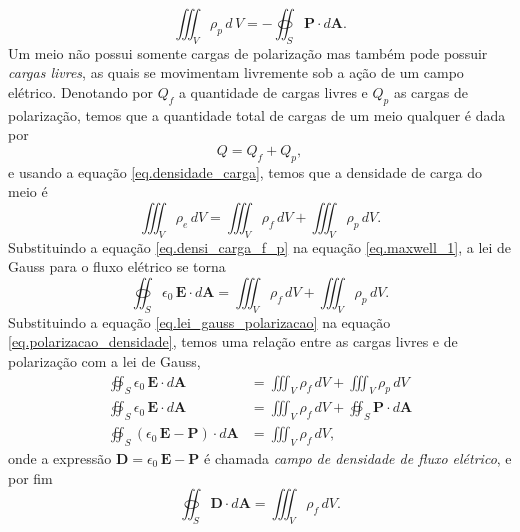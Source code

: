 \begin{equation}\label{eq.polarizacao_densidade}
\iiint_V\rho_p\,d\,V=-\oiint_S\mathbf{P}\cdot d\mathbf{A}.
\end{equation}
Um meio não possui somente cargas de polarização mas também pode possuir \textit{cargas livres}, as quais se movimentam livremente sob a ação de um campo elétrico. Denotando por $Q_f$ a quantidade de cargas livres e $Q_p$ as cargas de polarização, temos que a quantidade total de cargas de um meio qualquer é dada por
\begin{equation*}
Q=Q_f+Q_p,
\end{equation*} 
e usando a equação \ref{eq.densidade_carga}, temos que a densidade de carga do meio é
\begin{equation}\label{eq.densi_carga_f_p}
\iiint_{V}\rho_e\,dV=\iiint_{V}\rho_f\,dV+\iiint_{V}\rho_p\,dV.
\end{equation}
Substituindo a equação \ref{eq.densi_carga_f_p} na equação \ref{eq.maxwell_1}, a lei de Gauss para o fluxo elétrico se torna
\begin{equation}\label{eq.lei_gauss_polarizacao}
\oiint_S\epsilon_0\,\mathbf{E}\cdot d\mathbf{A}=\iiint_{V}\rho_f\,dV+\iiint_{V}\rho_p\,dV.
\end{equation}
Substituindo a equação \ref{eq.lei_gauss_polarizacao} na equação \ref{eq.polarizacao_densidade}, temos uma relação entre as cargas livres e de polarização com a lei de Gauss,
\begin{align*}
\oiint_S\epsilon_0\,\mathbf{E}\cdot d\mathbf{A}&=\iiint_{V}\rho_f\,dV+\iiint_{V}\rho_p\,dV\\
\oiint_S\epsilon_0\,\mathbf{E}\cdot d\mathbf{A}&=\iiint_{V}\rho_f\,dV+\oiint_S\mathbf{P}\cdot d\mathbf{A}\\
\oiint_S(\epsilon_0\,\mathbf{E}-\mathbf{P})\cdot d\mathbf{A}&=\iiint_{V}\rho_f\,dV,
\end{align*}
onde a expressão $\mathbf{D}=\epsilon_0\,\mathbf{E}-\mathbf{P}$ é chamada \textit{campo de densidade de fluxo elétrico}, e por fim
\begin{equation*}
\oiint_S\mathbf{D}\cdot d\mathbf{A}=\iiint_{V}\rho_f\,dV.
\end{equation*}

